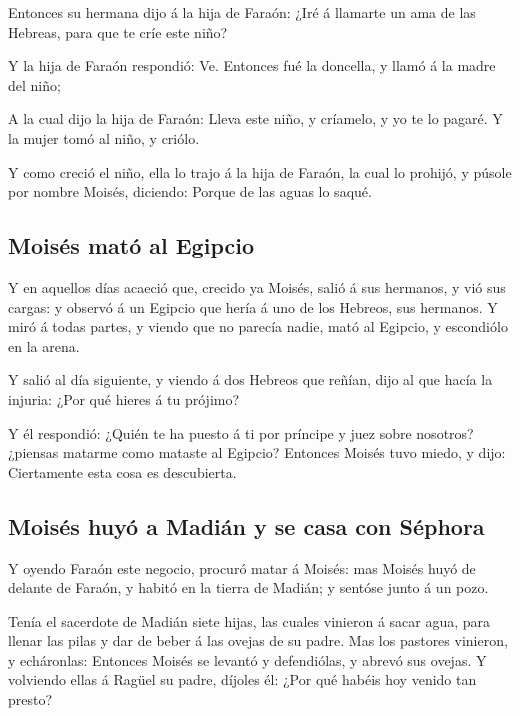  Entonces su hermana dijo á la hija de Faraón: ¿Iré á
llamarte un ama de las Hebreas, para que te críe este niño?

 Y la hija de Faraón respondió: Ve. Entonces fué la
doncella, y llamó á la madre del niño;

 A la cual dijo la hija de Faraón: Lleva este niño, y
críamelo, y yo te lo pagaré. Y la mujer tomó al niño, y criólo.

 Y como creció el niño, ella lo trajo á la hija de
Faraón, la cual lo prohijó, y púsole por nombre Moisés, diciendo: Porque
de las aguas lo saqué.

\hypertarget{moisuxe9s-matuxf3-al-egipcio}{%
\subsection{Moisés mató al Egipcio}\label{moisuxe9s-matuxf3-al-egipcio}}

 Y en aquellos días acaeció que, crecido ya Moisés, salió
á sus hermanos, y vió sus cargas: y observó á un Egipcio que hería á uno
de los Hebreos, sus hermanos.  Y miró á todas partes, y
viendo que no parecía nadie, mató al Egipcio, y escondiólo en la arena.

 Y salió al día siguiente, y viendo á dos Hebreos que
reñían, dijo al que hacía la injuria: ¿Por qué hieres á tu prójimo?

 Y él respondió: ¿Quién te ha puesto á ti por príncipe y
juez sobre nosotros? ¿piensas matarme como mataste al Egipcio? Entonces
Moisés tuvo miedo, y dijo: Ciertamente esta cosa es descubierta.

\hypertarget{moisuxe9s-huyuxf3-a-madiuxe1n-y-se-casa-con-suxe9phora}{%
\subsection{Moisés huyó a Madián y se casa con
Séphora}\label{moisuxe9s-huyuxf3-a-madiuxe1n-y-se-casa-con-suxe9phora}}

 Y oyendo Faraón este negocio, procuró matar á Moisés:
mas Moisés huyó de delante de Faraón, y habitó en la tierra de Madián; y
sentóse junto á un pozo.

 Tenía el sacerdote de Madián siete hijas, las cuales
vinieron á sacar agua, para llenar las pilas y dar de beber á las ovejas
de su padre.  Mas los pastores vinieron, y echáronlas:
Entonces Moisés se levantó y defendiólas, y abrevó sus ovejas.
 Y volviendo ellas á Ragüel su padre, díjoles él: ¿Por
qué habéis hoy venido tan presto?

